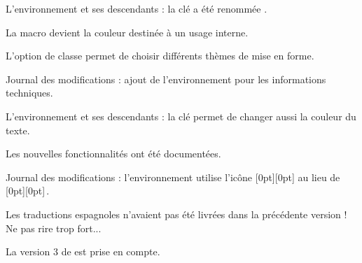 \tdocsep




\begin{tdocbreak}[version = 1.6.0, date = 2024-10-27]
    \item L'environnement  et ses descendants : la clé  a été renommée .

    \item La macro  devient la couleur  destinée à un usage interne.
\end{tdocbreak}


\begin{tdocnew}
    \item L'option de classe  permet de choisir différents thèmes de mise en forme.

    \item Journal des modifications : ajout de l'environnement  pour les informations techniques.

    \item L'environnement  et ses descendants : la clé  permet de changer aussi la couleur du texte.

    \item Les nouvelles fonctionnalités ont été documentées.
\end{tdocnew}


\begin{tdocupdate}
    \item Journal des modifications : l'environnement  utilise l'icône
    \raisebox{0pt}[0pt][0pt]{}
    au lieu de
    \raisebox{0pt}[0pt][0pt]{\fbox{\faMagic}}\,.
\end{tdocupdate}


\begin{tdocfix}
    \item Les traductions espagnoles n'avaient pas été livrées dans la précédente version ! Ne pas rire trop fort...
\end{tdocfix}

\tdocsep




\begin{tdoctech}[version = 1.5.0, date = 2024-10-19]
    \item La version 3 de  est prise en compte.
\end{tdoctech}


